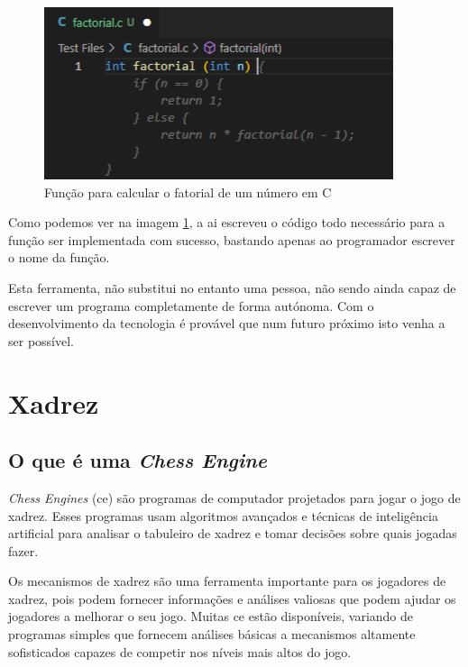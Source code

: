 \documentclass{report}
\begin{document}
\hfill

\begin{figure}[h]
    \centering
    \includegraphics{factorial.png}
    \caption{Função para calcular o fatorial de um número em C}
    \label{factorial1}
\end{figure}

Como podemos ver na imagem \ref{factorial1}, a \ac{ai} escreveu o código todo necessário para a função ser implementada com sucesso, bastando apenas ao programador escrever o nome da função.

Esta ferramenta, não substitui no entanto uma pessoa, não sendo ainda capaz de escrever um programa completamente de forma autónoma. Com o desenvolvimento da tecnologia é provável que num futuro próximo isto venha a ser possível.
\chapter{Xadrez}
\label{chap.xadrez}

\section{O que é uma \textit{Chess Engine}}

\textit{Chess Engines} (\ac{ce}) são programas de computador projetados para jogar o jogo de xadrez. Esses programas usam algoritmos avançados e técnicas de inteligência artificial para analisar o tabuleiro de xadrez e tomar decisões sobre quais jogadas fazer.

Os mecanismos de xadrez são uma ferramenta importante para os jogadores de xadrez, pois podem fornecer informações e análises valiosas que podem ajudar os jogadores a melhorar o seu jogo. Muitas \ac{ce} estão disponíveis, variando de programas simples que fornecem análises básicas a mecanismos altamente sofisticados capazes de competir nos níveis mais altos do jogo.
\end{document}
